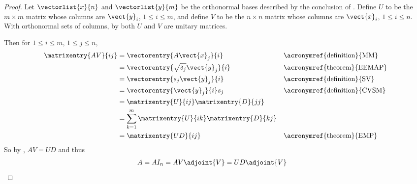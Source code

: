 %
\begin{proof}
Let $\vectorlist{x}{n}$ and $\vectorlist{y}{m}$ be the orthonormal bases described by the conclusion of .  Define $U$ to be the $m\times m$ matrix whose columns are $\vect{y}_i$, $1\leq i\leq m$, and define $V$ to be the $n\times n$ matrix whose columns are $\vect{x}_i$, $1\leq i\leq n$.  With orthonormal sets of columns, by  both $U$ and $V$ are unitary matrices.\par
%
Then for $1\leq i\leq m$, $1\leq j\leq n$,
%
\begin{align*}
\matrixentry{AV}{ij}
&=\vectorentry{A\vect{x}_j}{i}&&\text{\acronymref{definition}{MM}}\\
&=\vectorentry{\sqrt{\delta_j}\vect{y}_j}{i}&&\text{\acronymref{theorem}{EEMAP}}\\
&=\vectorentry{s_j\vect{y}_j}{i}&&\text{\acronymref{definition}{SV}}\\
&=\vectorentry{\vect{y}_j}{i}s_j&&\text{\acronymref{definition}{CVSM}}\\
&=\matrixentry{U}{ij}\matrixentry{D}{jj}\\
&=\sum_{k=1}^{m}\matrixentry{U}{ik}\matrixentry{D}{kj}\\
&=\matrixentry{UD}{ij}&&\text{\acronymref{theorem}{EMP}}
\end{align*}
%
So by , $AV=UD$ and thus
%
\begin{align*}
A&=AI_n=AV\adjoint{V}=UD\adjoint{V}
\end{align*}
%
\end{proof}
%  
